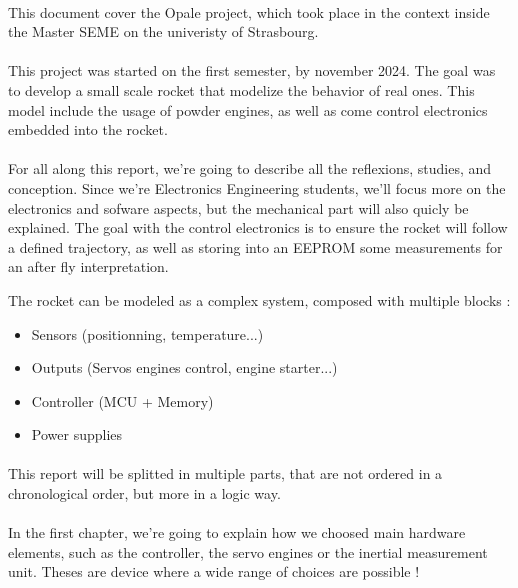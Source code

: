 \paragraph{}
This document cover the Opale project, which took place in the context inside the Master SEME
on the univeristy of Strasbourg.

\paragraph{}
This project was started on the first semester, by november 2024. The goal was to develop a
small scale rocket that modelize the behavior of real ones. This model include the usage
of powder engines, as well as come control electronics embedded into the rocket.

\paragraph{}
For all along this report, we're going to describe all the reflexions, studies, and conception.
Since we're Electronics Engineering students, we'll focus more on the electronics and sofware aspects,
but the mechanical part will also quicly be explained.
The goal with the control electronics is to ensure the rocket will follow a defined trajectory, as
well as storing into an EEPROM some measurements for an after fly interpretation.

The rocket can be modeled as a complex system, composed with multiple blocks :

\begin{itemize}[noitemsep]
    \item   Sensors (positionning, temperature...)
    \item   Outputs (Servos engines control, engine starter...)
    \item   Controller (MCU + Memory)
    \item   Power supplies
\end{itemize}

\paragraph{}
This report will be splitted in multiple parts, that are not ordered in a chronological order, but
more in a logic way.

\paragraph{}
In the first chapter, we're going to explain how we choosed main hardware elements, such as the controller,
the servo engines or the inertial measurement unit. Theses are device where a wide range of choices are possible !

